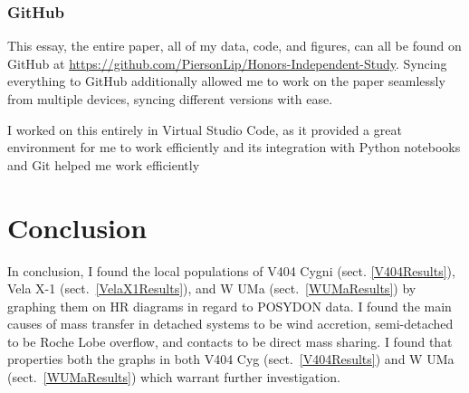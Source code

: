\documentclass[12pt, a4paper]{article}
\begin{document}
        \subsubsection{GitHub} \label{GitHub}
            This essay, the entire paper, all of my data, code, and figures, can all be found on GitHub at \url{https://github.com/PiersonLip/Honors-Independent-Study}. Syncing everything to GitHub additionally allowed me to work on the paper seamlessly from multiple devices, syncing different versions with ease. 

            I worked on this entirely in Virtual Studio Code, as it provided a great environment for me to work efficiently and its integration with Python notebooks and Git helped me work efficiently

\section{\centering Conclusion}
    In conclusion, I found the local populations of V404 Cygni (sect. \ref{V404Results}), Vela X-1 (sect.~\ref{VelaX1Results}), and W UMa (sect.~\ref{WUMaResults}) by graphing them on HR diagrams in regard to POSYDON data. I found the main causes of mass transfer in detached systems to be wind accretion, semi-detached to be Roche Lobe overflow, and contacts to be direct mass sharing. I found that properties both the graphs in both V404 Cyg (sect.~\ref{V404Results}) and W UMa (sect.~\ref{WUMaResults}) which warrant further investigation.


    
\printbibliography[
heading=bibintoc,
title={\centering Sources}
]
\end{document}
